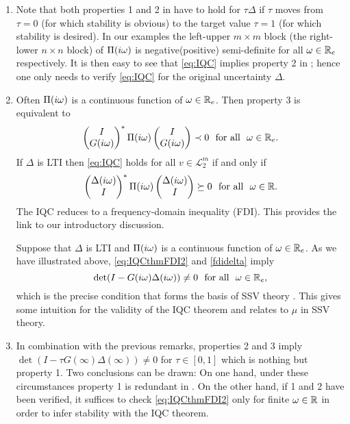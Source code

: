 \begin{rem}\label{remiqc}
\begin{enumerate}
  \item Note that both properties 1 and 2 in  have to hold for $\tau\Delta$ 
if $\tau$ moves from $\tau=0$ (for which stability is obvious) to the target value $\tau=1$ 
(for which stability is desired). In our examples the left-upper $m\times m$ block (the right-lower 
$n\times n$ block) of $\Pi(i\omega)$ is negative(positive) semi-definite for all $\omega\in\mathbb{R}_e$ 
respectively. It is then easy to see that \eqref{eq:IQC} implies property 2 in ; 
hence one only needs to verify \eqref{eq:IQC} for the original uncertainty $\Delta$.
\item
Often $\Pi(i\omega)$ is a continuous function of $\omega\in\mathbb{R}_e$. Then property 3 is equivalent to
\begin{equation}
\begin{pmatrix}I\\G(i\omega)\end{pmatrix}^*\Pi(i\omega)\begin{pmatrix}I\\G(i\omega)\end{pmatrix} \prec 0
\text{\ \ for all\ \ }\omega\in\mathbb{R}_e.
\label{eq:IQCthmFDI2}
\end{equation}
If $\Delta$ is LTI then \eqref{eq:IQC} holds for all $v\in\mathcal{L}^m_2$ if and only if
\begin{equation}
\begin{pmatrix}\Delta(i\omega)\\I\end{pmatrix}^*\Pi(i\omega)\begin{pmatrix}\Delta(i\omega)\\I\end{pmatrix} \succeq 0
\text{\ \ for all\ \ }\omega\in\mathbb{R}.
\label{fdidelta}
\end{equation}
The IQC reduces to a frequency-domain inequality (FDI). This provides the link to our introductory discussion.

Suppose that $\Delta$ is LTI and $\Pi(i\omega)$ is a continuous function
of $\omega\in\mathbb{R}_e$. As we have illustrated above, \eqref{eq:IQCthmFDI2} and \eqref{fdidelta} imply
\begin{equation}
\det(I-G(\iw)\Delta(\iw))\neq 0\text{\ \ for all\ \ }\omega\in\Realext,
\end{equation}
which is the precise condition that forms the basis of SSV theory \cite{packdoyle}. This gives some intuition for the validity
of the IQC theorem and relates to $\mu$ in SSV theory. 
\item  In combination with the previous remarks, properties 2 and 3 imply
$\det(I-\tau G(\infty)\Delta(\infty))\neq 0$ for $\tau\in[0,1]$
which is nothing but property 1.
Two conclusions can be drawn: On one hand, under these circumstances property 1 is redundant in . On the other 
hand, if 1 and 2 have been verified, it suffices to check \eqref{eq:IQCthmFDI2} only for finite $\omega\in\mathbb{R}$ in order to infer stability with the IQC theorem.
\end{enumerate}
\end{rem}


